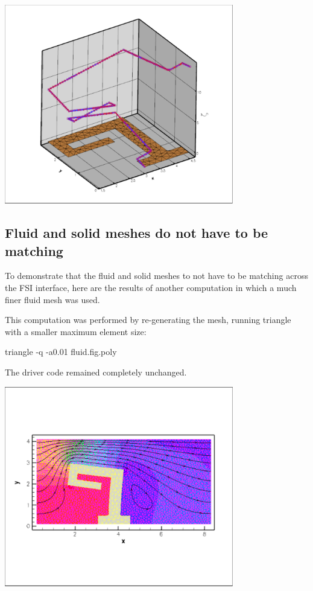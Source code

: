 
\begin{DoxyImage}
\includegraphics[width=0.75\textwidth]{boundary_coordinate_check}
\end{DoxyImage}




\hypertarget{index_non_matching}{}\subsection{Fluid and solid meshes do not have to be matching}\label{index_non_matching}
To demonstrate that the fluid and solid meshes to not have to be matching across the F\+SI interface, here are the results of another computation in which a much finer fluid mesh was used.

This computation was performed by re-\/generating the mesh, running triangle with a smaller maximum element size\+:


\begin{DoxyCode}
triangle -q -a0.01 fluid.fig.poly
\end{DoxyCode}


The driver code remained completely unchanged.

 
\begin{DoxyImage}
\includegraphics[width=0.75\textwidth]{flow_fine}
\end{DoxyImage}




